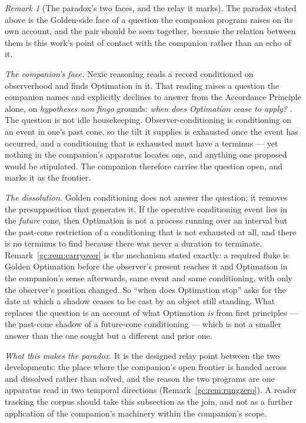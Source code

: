 \documentclass[11pt]{article}
\numberwithin{equation}{section}
\theoremstyle{plain}
\theoremstyle{definition}
\theoremstyle{remark}
\newtheorem{remark}[theorem]{Remark}
\begin{document}
\begin{remark}[The paradox's two faces, and the relay it marks]
\label{ra:rem:relay}
The paradox stated above is the Golden-side face of a question the
companion program raises on its own account, and the pair should be
seen together, because the relation between them is this work's point
of contact with the companion rather than an echo of it.

\emph{The companion's face.} Nexic reasoning reads a record conditioned
on observerhood and finds Optimation in it. That reading raises a
question the companion names and explicitly declines to answer from the
Accordance Principle alone, on \emph{hypotheses non fingo} grounds:
\emph{when does Optimation cease to apply?} \cite{Aethus}. The question
is not idle housekeeping. Observer-conditioning is conditioning on an
event in one's past cone, so the tilt it supplies is exhausted once the
event has occurred, and a conditioning that is exhausted must have a
terminus --- yet nothing in the companion's apparatus locates one, and
anything one proposed would be stipulated. The companion therefore
carries the question open, and marks it as the frontier.

\emph{The dissolution.} Golden conditioning does not answer the
question; it removes the presupposition that generates it. If the
operative conditioning event lies in the \emph{future} cone, then
Optimation is not a process running over an interval but the past-cone
restriction of a conditioning that is not exhausted at all, and there
is no terminus to find because there was never a duration to
terminate. Remark~\ref{gc:rem:carryover} is the mechanism stated
exactly: a required fluke is Golden Optimation before the observer's
present reaches it and Optimation in the companion's sense afterwards,
same event and same conditioning, with only the observer's position
changed. So ``when does Optimation stop'' asks for the date at which a
shadow ceases to be cast by an object still standing. What replaces the
question is an account of what Optimation \emph{is} from first
principles --- the past-cone shadow of a future-cone conditioning ---
which is not a smaller answer than the one sought but a different and
prior one.

\emph{What this makes the paradox.} It is the designed relay point
between the two developments: the place where the companion's open
frontier is handed across and dissolved rather than solved, and the
reason the two programs are one apparatus read in two temporal
directions (Remark~\ref{gc:rem:rungzero}). A reader tracking the corpus
should take this subsection as the join, and not as a further
application of the companion's machinery within the companion's scope.


\end{remark}
\end{document}
